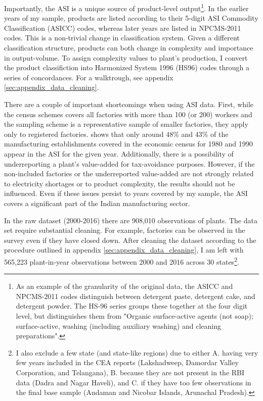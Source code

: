 \documentclass[11pt]{article}
\begin{document}
Importantly, the ASI is a unique source of product-level output\footnote{As an example of the granularity of the original data, the ASICC and NPCMS-2011 codes distinguish between detergent paste, detergent cake, and detergent powder. The HS-96 series groups these together at the four digit level, but distinguishes them from "Organic surface-active agents (not soap); surface-active, washing (including auxiliary washing) and cleaning preparations".}. In the earlier years of my sample, products are listed according to their 5-digit ASI Commodity Classification (ASICC) codes, whereas later years are listed in NPCMS-2011 codes. This is a non-trivial change in classification system. Given a different classification structure, products can both change in complexity and importance in output-volume. To assign complexity values to plant's production, I convert the product classifiction into Harmonized System 1996 (HS96) codes through a series of concordances. For a walktrough, see appendix \ref{sec:appendix_data_cleaning}.

There are a couple of important shortcomings when using ASI data. First, while the census schemes covers all factories with more than 100 (or 200) workers and the sampling scheme is a representative sample of smaller factories, they apply only to registered factories. \cite{nagaraj_how_2002} shows that only around 48\% and 43\% of the manufacturing establishments covered in the economic census for 1980 and 1990 appear in the ASI for the given year. Additionally, there is a possibility of underreporting a plant's value-added for tax-avoidance purposes. However, if the non-included factories or the underreported value-added are not strongly related to electricity shortages or to product complexity, the results should not be influenced. Even if these issues persist to years covered by my sample, the ASI covers a significant part of the Indian manufacturing sector.

In the raw dataset (2000-2016) there are 908,010 observations of plants. The data set require substantial cleaning. For example, factories can be observed in the survey even if they have closed down. After cleaning the dataset according to the procedure outlined in appendix \ref{sec:appendix_data_cleaning}, I am left with 565,223 plant-in-year observations between 2000 and 2016 across 30 states\footnote{I also exclude a few state (and state-like regions) due to either A. having very few years included in the CEA reports (Lakshadweep, Damordar Valley Corporation, and Telangana), B. because they are not present in the RBI data (Dadra and Nagar Haveli), and C. if they have too few observations in the final base sample (Andaman and Nicobar Islands, Arunachal Pradesh).}.
\end{document}
